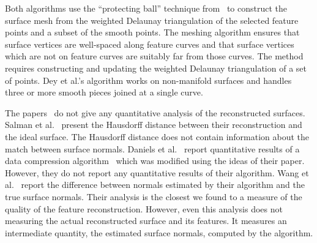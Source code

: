 Both algorithms use the ``protecting ball'' technique from~\cite{cdr-drpsc-07}
to construct the surface mesh from the weighted Delaunay triangulation
of the selected feature points and a subset of the smooth points.
The meshing algorithm ensures that surface vertices are well-spaced
along feature curves and that surface vertices which are not 
on feature curves are suitably far from those curves.
The method requires constructing and 
updating the weighted Delaunay triangulation of a set of points.
Dey et al.'s algorithm works on non-manifold surfaces
and handles three or more smooth pieces joined at a single curve.

The papers~\cite{avron2010L,Dey2012,fcs-rmlsf-2005,Oztireli2009}
do not give any quantitative analysis of the reconstructed surfaces.
Salman et al.~\cite{sym-fpmg-10} present the Hausdorff distance
between their reconstruction and the ideal surface.
The Hausdorff distance does not contain information
about the match between surface normals.
Daniels et al.~\cite{Daniels:2007:Robust} report quantitative
results of a data compression algorithm~\cite{Ochotta:2004:Compression}
which was modified using the ideas of their paper.
However, they do not report any quantitative results of their algorithm.
Wang et al.~\cite{Wang:2013:Feature} report the difference 
between normals estimated by their algorithm and the true surface normals.
Their analysis is the closest we found to a measure
of the quality of the feature reconstruction.
However, even this analysis 
does not measuring the actual reconstructed surface and its features.
It measures an intermediate quantity,
the estimated surface normals, computed by the algorithm.
